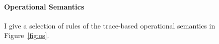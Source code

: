 \paragraph*{Operational Semantics}
I give a selection of rules of the trace-based operational semantics in Figure~\ref{fig:os}. 

